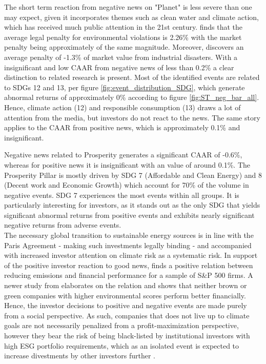 The short term reaction from negative news on "Planet" is less severe than one may expect, given it incorporates themes such as clean water and climate action, which has received much public attention in the 21st century. \cite{karpoff2005reputational} finds that the average legal penalty for environmental violations is 2.26\% with the market penalty being approximately of the same magnitude. Moreover, \cite{capelle2010does} discovers an average penalty of -1.3\% of market value from industrial disasters. With a insignificant and low CAAR from negative news of less than 0.2\% a clear distinction to related research is present. Most of the identified events are related to SDGs 12 and 13, per figure \ref{fig:event_distribution_SDG}, which generate abnormal returns of approximately 0\% according to figure \ref{fig:ST_neg_bar_all}. Hence, climate action (12) and responsible consumption (13) draws a lot of attention from the media, but investors do not react to the news. The same story applies to the CAAR from positive news, which is approximately 0.1\% and insignificant. 

Negative news related to Prosperity generates a significant CAAR of -0.6\%, whereas for positive news it is insignificant with an value of around 0.1\%. The Prosperity Pillar is mostly driven by SDG 7 (Affordable and Clean Energy) and 8 (Decent work and Economic Growth) which account for 70\% of the volume in negative events. SDG 7 experiences the most events within all groups. It is particularly interesting for investors, as it stands out as the only SDG that yields significant abnormal returns from positive events and exhibits nearly significant negative returns from adverse events.\\
The necessary global transition to sustainable energy sources is in line with the Paris Agreement - making such investments legally binding - and accompanied with increased investor attention on climate risk as a systematic risk. In support of the positive investor reaction to good news, \cite{hart1996does} finds a positive relation between reducing emissions and financial performance for a sample of S\&P 500 firms. A newer study from \cite{paytobegreen} elaborates on the relation and shows that neither brown or green companies with higher environmental scores perform better financially. Hence, the investor decisions to positive and negative events are made purely from a social perspective. As such, companies that does not live up to climate goals are not necessarily penalized from a profit-maximization perspective, however they bear the risk of being black-listed by institutional investors with high ESG portfolio requirements, which as an isolated event is expected to increase divestments by other investors further \cite{dell2021norwegian}. 

